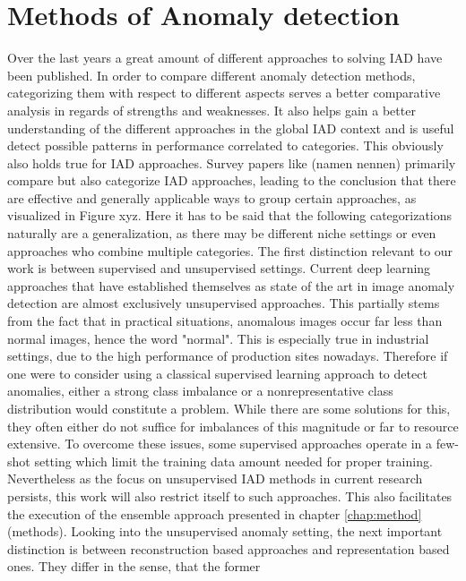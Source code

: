 \section{Methods of Anomaly detection}
\label{sec:IADcategs}
Over the last years a great amount of different approaches to solving IAD have been published. In order to compare different anomaly detection methods, categorizing them with respect to different 
aspects serves a better comparative analysis in regards of strengths and weaknesses.  It also helps gain a better understanding of the different approaches in the global IAD context and
is useful detect possible patterns in performance correlated to categories. This obviously also holds true for IAD approaches. Survey papers like (namen nennen) \cite{Xie_2024benchmarking} 
\cite{liu2024deep} primarily compare but also categorize IAD approaches, leading to the conclusion that there are effective and generally applicable ways to group certain approaches, as 
visualized in Figure xyz. Here it has to be said that the following categorizations naturally are a generalization, as there may be different niche settings or even approaches who combine multiple categories.
\newline
The first distinction relevant to our work is between supervised and unsupervised settings. Current deep learning approaches that have established themselves as state of the art in image anomaly detection 
are almost exclusively unsupervised approaches. This partially stems from the fact 
that in practical situations, anomalous images occur far less than normal images, hence the word "normal". This is especially true in industrial settings, due to the high performance of 
production sites nowadays. Therefore if one were to consider using a classical supervised learning approach to detect anomalies, either a strong class imbalance or a nonrepresentative class 
distribution would constitute a problem. While there are some solutions for this, they often either do not suffice for imbalances of this magnitude or far to resource extensive. To overcome 
these issues, some supervised approaches \cite{Chu_2020supervised} operate in a few-shot setting which limit the training data amount needed for proper training. Nevertheless as the focus on 
unsupervised IAD methods in current research persists, 
this work will also restrict itself to such approaches. This also facilitates the execution of the ensemble approach presented in chapter \ref{chap:method}(methods).
\newline
Looking into the unsupervised anomaly setting, the next important distinction is between reconstruction based approaches and representation based ones. They differ in the sense, that the former 
